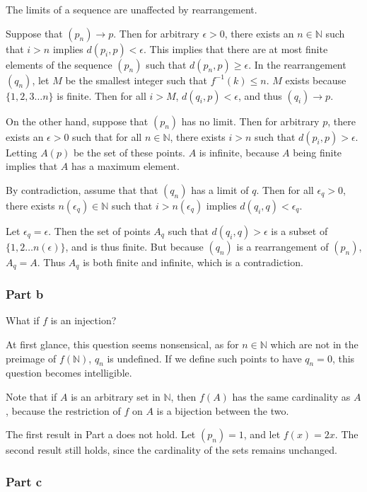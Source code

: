 \documentclass{article}
\begin{document}
The limits of a sequence are unaffected by rearrangement.

Suppose that $(p_n) \rightarrow p$. Then for arbitrary $\epsilon > 0$, there exists an $n \in \mathbb{N}$ such that $i > n$ implies $d(p_i, p) < \epsilon$. This implies that there are at most finite elements of the sequence $(p_n)$ such that $d(p_n, p) \geq \epsilon$. In the rearrangement $(q_n)$, let $M$ be the smallest integer such that $f^{-1}(k) \leq n$. $M$ exists because $\{1, 2, 3\dots n\}$ is finite. Then for all $i > M$, $d(q_i, p) < \epsilon$, and thus $(q_i) \rightarrow p$.

On the other hand, suppose that $(p_n)$ has no limit. Then for arbitrary $p$, there exists an $\epsilon > 0$ such that for all $n \in \mathbb{N}$, there exists $i > n$ such that $d(p_i, p) > \epsilon$. Letting $A(p)$ be the set of these points. $A$ is infinite, because $A$ being finite implies that $A$ has a maximum element.

By contradiction, assume that that $(q_n)$ has a limit of $q$. Then for all $\epsilon_q > 0$, there exists $n(\epsilon_q) \in \mathbb{N}$ such that $i > n(\epsilon_q)$ implies $d(q_i, q) < \epsilon_q$.

Let $\epsilon_q = \epsilon$. Then the set of points $A_q$ such that $d(q_i, q) > \epsilon$ is a subset of $\{1, 2 \dots n(\epsilon)\}$, and is thus finite. But because $(q_n)$ is a rearrangement of $(p_n)$, $A_q = A$. Thus $A_q$ is both finite and infinite, which is a contradiction.

\subsubsection*{Part b}

What if $f$ is an injection?

At first glance, this question seems nonsensical, as for $n\in\mathbb{N}$ which are not in the preimage of $f(\mathbb{N})$, $q_n$ is undefined. If we define such points to have $q_n = 0$, this question becomes intelligible.

Note that if $A$ is an arbitrary set in $\mathbb{N}$, then $f(A)$ has the same cardinality as $A$, because the restriction of $f$ on $A$ is a bijection between the two.

The first result in Part a does not hold. Let $(p_n) = 1$, and let $f(x) = 2x$. The second result still holds, since the cardinality of the sets remains unchanged.

\subsubsection*{Part c}
\end{document}
